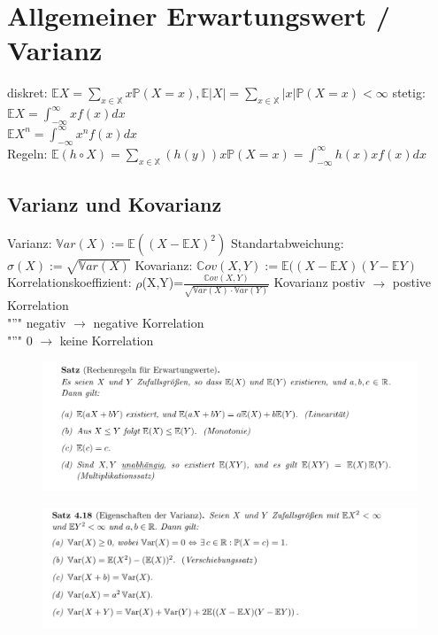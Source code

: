 \documentclass[]{article}
\begin{document}
\section{Allgemeiner Erwartungswert / Varianz }
diskret: $\mathbb{E}X =\sum_{x \in \mathbb{X}} x \mathbb{P}(X=x), \mathbb{E}|X|=\sum_{x \in \mathbb{X}} |x| \mathbb{P}(X=x) <\infty   $
stetig: $\mathbb{E}X =\int_{-\infty}^{\infty} x f(x) dx $\\ $\mathbb{E}X^n =\int_{-\infty}^{\infty} x^n f(x) dx $\\
Regeln:
$\mathbb{E}(h \circ X) =\sum_{x \in \mathbb{X}} (h(y)) x \mathbb{P}(X=x) =\int_{-\infty}^{\infty} h(x) x f(x) dx $


\subsection{Varianz und Kovarianz}
Varianz: $\mathbb{V}ar(X):=\mathbb{E}((X-\mathbb{E}X)^2)$
Standartabweichung: $\sigma(X):=\sqrt{\mathbb{V}ar(X)}$
Kovarianz: $\mathbb{C}ov(X,Y):=\mathbb{E}((X-\mathbb{E}X)(Y-\mathbb{E}Y)$\\
Korrelationskoeffizient: $\rho$(X,Y)=$\frac{\mathbb{C}ov(X,Y)}{\sqrt{\mathbb{V}ar(X) \cdot \mathbb{V}ar(Y)}}$
Kovarianz postiv $\rightarrow$ postive Korrelation \\
"''" negativ $\rightarrow$ negative Korrelation \\
"''" 0 $\rightarrow$ keine Korrelation
\newpage
\begin{figure}
	\centering
	\includegraphics[width=1.0\linewidth]{Rechenregelnerwartungswert}
	\label{fig:rechenregelnerwartungswert}
\end{figure}
\begin{figure}
	\centering
	\includegraphics[width=1.0\linewidth]{Rechenregelnvarianz}
	\label{fig:rechenregelnvarianz}
\end{figure}
\end{document}
